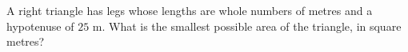 A right triangle has legs whose lengths are whole numbers of metres and a hypotenuse of $25$ m. What is the smallest possible area of the triangle, in square metres?
